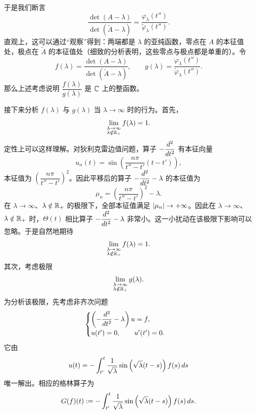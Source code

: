 于是我们断言
\[
\frac{\det(A-\lambda)}{\det(\tilde A-\lambda)}=
\frac{\varphi_\lambda(t'')}{\tilde\varphi_\lambda(t'')}.
\tag{$*$}
\]
直观上，这可以通过“观察”得到：两端都是 $\lambda$ 的亚纯函数，零点在 $A$ 的本征值处，极点在 $\tilde A$ 的本征值处（细致的分析表明，这些零点与极点都是单重的）。令
\[
f(\lambda)=\frac{\det(A-\lambda)}{\det(\tilde A-\lambda)},
\qquad
g(\lambda)=\frac{\varphi_\lambda(t'')}{\tilde\varphi_\lambda(t'')}.
\]
那么上述考虑说明 $\dfrac{f(\lambda)}{g(\lambda)}$ 是 $\mathbb{C}$ 上的整函数。

接下来分析 $f(\lambda)$ 与 $g(\lambda)$ 当 $\lambda\to\infty$ 时的行为。首先，
\[
\lim_{\substack{\lambda\to\infty\\ \lambda\notin\mathbb{R}_+}}f(\lambda)=1.
\]
定性上可以这样理解。对狄利克雷边值问题，算子 $-\dfrac{d^2}{d t^2}$ 有本征向量
\[
u_n(t)=\sin\left(\frac{n\pi}{t''-t'}(t-t')\right),
\]
本征值为 $\left(\dfrac{n\pi}{t''-t'}\right)^2$。因此平移后的算子 $-\dfrac{d^2}{d t^2}-\lambda$ 的本征值为
\[
\mu_n=\left(\frac{n\pi}{t''-t'}\right)^2-\lambda.
\]
在 $\lambda\to\infty$、$\lambda\notin\mathbb{R}_+$ 的极限下，全部本征值满足 $\lvert \mu_n\rvert\to+\infty$。因此在 $\lambda\to\infty$、$\lambda\notin\mathbb{R}_+$ 时，$\Theta(t)$ 相比算子 $-\dfrac{d^2}{d t^2}-\lambda$ 非常小。这一小扰动在该极限下影响可以忽略。于是自然地期待
\[
\lim_{\substack{\lambda\to\infty\\ \lambda\notin\mathbb{R}_+}}f(\lambda)=1.
\]
其次，考虑极限
\[
\lim_{\substack{\lambda\to\infty\\ \lambda\notin\mathbb{R}_+}}g(\lambda).
\]
为分析该极限，先考虑非齐次问题
\[
\begin{cases}
\left(-\dfrac{d^2}{d t^2}-\lambda\right)u=f,\\[2mm]
u(t')=0,\qquad u'(t')=0.
\end{cases}
\]
它由
\[
u(t)=-\int_{t'}^{t}\frac{1}{\sqrt\lambda}\sin\left(\sqrt\lambda(t-s)\right)f(s)\,d s
\]
唯一解出。相应的格林算子为
\[
G(f)(t):=-\int_{t'}^{t}\frac{1}{\sqrt\lambda}\sin\left(\sqrt\lambda(t-s)\right)f(s)\,d s.
\]

